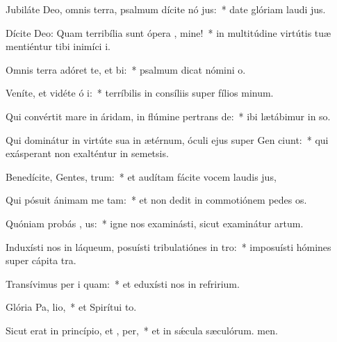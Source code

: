 \item Jubiláte Deo, omnis terra, psalmum dícite nó jus:~* date glóriam laudi jus.
\item Dícite Deo: Quam terribília sunt ópera , mine!~* in multitúdine virtútis tuæ mentiéntur tibi inimíci i.
\item Omnis terra adóret te, et  bi:~* psalmum dicat nómini o.
\item Veníte, et vidéte ó i:~* terríbilis in consíliis super fílios minum.
\item Qui convértit mare in áridam, in flúmine pertrans de:~* ibi lætábimur in so.
\item Qui dominátur in virtúte sua in ætérnum, óculi ejus super Gen ciunt:~* qui exásperant non exalténtur in semetsis.
\item Benedícite, Gentes,  trum:~* et audítam fácite vocem laudis jus,
\item Qui pósuit ánimam me  tam:~* et non dedit in commotiónem pedes os.
\item Quóniam probás , us:~* igne nos examinásti, sicut examinátur artum.
\item Induxísti nos in láqueum, posuísti tribulatiónes in  tro:~* imposuísti hómines super cápita tra.
\item Transívimus per i  quam:~* et eduxísti nos in refririum.
\item Glória Pa,  lio,~* et Spirítui to.
\item Sicut erat in princípio, et ,  per,~* et in sǽcula sæculórum. men.
